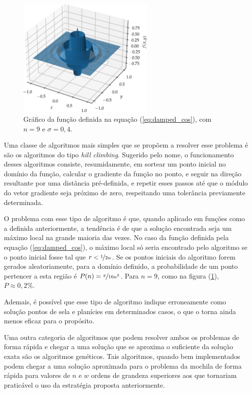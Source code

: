 \begin{figure}
  \centering
  \includegraphics[width=0.6\textwidth]{imagens/damped_cossine.png}
  \caption{Gráfico da função definida na equação (\ref{eq:damped_cos}), com $ n = 9 $ e $ \sigma = 0,4 $.}
  \label{fig:damped_cos}
\end{figure}

Uma classe de algoritmos mais simples que se propõem a resolver esse problema é são os algoritmos do
tipo \textit{hill climbing}. Sugerido pelo nome, o funcionamento desses algoritmos consiste, resumidamente,
em sortear um ponto inicial no domínio da função, calcular o gradiente da função no ponto, e seguir
na direção resultante por uma distância pré-definida, e repetir esses passos até que o módulo do
vetor gradiente seja próximo de zero, respeitando uma tolerância previamente determinada. 

O problema com esse tipo de algoritmo é que, quando aplicado em funções como a definida anteriormente, a tendência é
de que a solução encontrada seja um máximo local na grande maioria das vezes. No caso da função definida
pela equação (\ref{eq:damped_cos}), o máximo local só seria encontrado pelo algoritmo se o ponto inicial
fosse tal que $ r < \nicefrac{1}{2n} $. Se os pontos iniciais do algoritmo forem gerados aleatoriamente,
para a domínio definido, a probabilidade de um ponto pertencer a esta região é $ P(n) = \nicefrac{\pi}{16n^2} $.
Para $ n = 9 $, como na figura (\ref{fig:damped_cos}), $ P \approx 0,2\% $. 

Ademais, é possível que esse tipo
de algoritmo indique erroneamente como solução pontos de sela e planícies em determinados casos, o que o
torna ainda menos eficaz para o propósito.

Uma outra categoria de algoritmos que podem resolver ambos os problemas de forma rápida e chegar a uma
solução que se aproxima o suficiente da solução exata são os algoritmos genéticos. Tais algoritmos,
quando bem implementados podem chegar a uma solução aproximada para o problema da mochila de forma
rápida para valores de $n$ e $w$ ordens de grandeza superiores aos que tornariam praticável o uso da
estratégia proposta anteriormente. 

